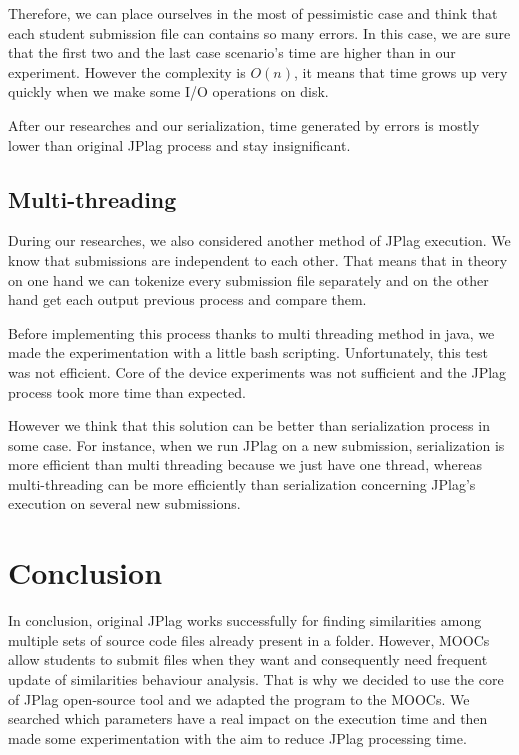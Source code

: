 \documentclass[twoside]{article}
\begin{document}
\begin{multicols*}{2}
Therefore, we can place ourselves in the most of pessimistic case and think that each student submission file can contains so many errors. In this case, we are sure that the first two and the last case scenario's time are higher than in our experiment. However the complexity is $O(n)$, it means that time grows up very quickly when we make some I/O operations on disk. 

After our researches and our serialization, time generated by errors is mostly lower than original JPlag process and stay insignificant.

\subsection{Multi-threading}

During our researches, we also considered another method of JPlag execution. We know that submissions are independent to each other. That means that in theory on one hand we can tokenize every submission file separately and on the other hand get each output previous process and compare them. 

Before implementing this process thanks to multi threading method in java, we made the experimentation with a little bash scripting. Unfortunately, this test was not efficient. Core of the device experiments was not sufficient and the JPlag process took more time than expected. 

However we think that this solution can be better than serialization process in some case. For instance, when we run JPlag on a new submission, serialization is more efficient than multi threading because we just have one thread, whereas multi-threading can be more efficiently than serialization concerning JPlag's execution on several new submissions.


\vspace{0.5cm}
\section{Conclusion}

In conclusion, original JPlag works successfully for finding similarities among multiple sets of source code files already present in a folder. However, MOOCs allow students to submit files when they want and consequently need frequent update of similarities behaviour analysis. That is why we decided to use the core of JPlag open-source tool and we adapted the program to the MOOCs. We searched which parameters have a real impact on the execution time and then made some experimentation with the aim to reduce JPlag processing time. 


\end{multicols*}
\end{document}
